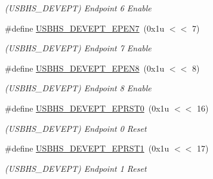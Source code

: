 \begin{DoxyCompactItemize}
\begin{DoxyCompactList}\small\item\em (U\+S\+B\+H\+S\+\_\+\+D\+E\+V\+E\+PT) Endpoint 6 Enable \end{DoxyCompactList}\item 
\mbox{\label{group__SAMS70__USBHS_gab90a8c74e8571613e2e42b2058569e12}} 
\#define \mbox{\hyperlink{group__SAMS70__USBHS_gab90a8c74e8571613e2e42b2058569e12}{U\+S\+B\+H\+S\+\_\+\+D\+E\+V\+E\+P\+T\+\_\+\+E\+P\+E\+N7}}~(0x1u $<$$<$ 7)
\begin{DoxyCompactList}\small\item\em (U\+S\+B\+H\+S\+\_\+\+D\+E\+V\+E\+PT) Endpoint 7 Enable \end{DoxyCompactList}\item 
\mbox{\label{group__SAMS70__USBHS_ga3a373963e79552b55d5c58576acd26e8}} 
\#define \mbox{\hyperlink{group__SAMS70__USBHS_ga3a373963e79552b55d5c58576acd26e8}{U\+S\+B\+H\+S\+\_\+\+D\+E\+V\+E\+P\+T\+\_\+\+E\+P\+E\+N8}}~(0x1u $<$$<$ 8)
\begin{DoxyCompactList}\small\item\em (U\+S\+B\+H\+S\+\_\+\+D\+E\+V\+E\+PT) Endpoint 8 Enable \end{DoxyCompactList}\item 
\mbox{\label{group__SAMS70__USBHS_gaa1dded3e04fd3b1b0bb6974490c7eeb4}} 
\#define \mbox{\hyperlink{group__SAMS70__USBHS_gaa1dded3e04fd3b1b0bb6974490c7eeb4}{U\+S\+B\+H\+S\+\_\+\+D\+E\+V\+E\+P\+T\+\_\+\+E\+P\+R\+S\+T0}}~(0x1u $<$$<$ 16)
\begin{DoxyCompactList}\small\item\em (U\+S\+B\+H\+S\+\_\+\+D\+E\+V\+E\+PT) Endpoint 0 Reset \end{DoxyCompactList}\item 
\mbox{\label{group__SAMS70__USBHS_ga64ccf2f6332cb69a6bcd437af4aa8de8}} 
\#define \mbox{\hyperlink{group__SAMS70__USBHS_ga64ccf2f6332cb69a6bcd437af4aa8de8}{U\+S\+B\+H\+S\+\_\+\+D\+E\+V\+E\+P\+T\+\_\+\+E\+P\+R\+S\+T1}}~(0x1u $<$$<$ 17)
\begin{DoxyCompactList}\small\item\em (U\+S\+B\+H\+S\+\_\+\+D\+E\+V\+E\+PT) Endpoint 1 Reset \end{DoxyCompactList}\item 

\end{DoxyCompactItemize}
